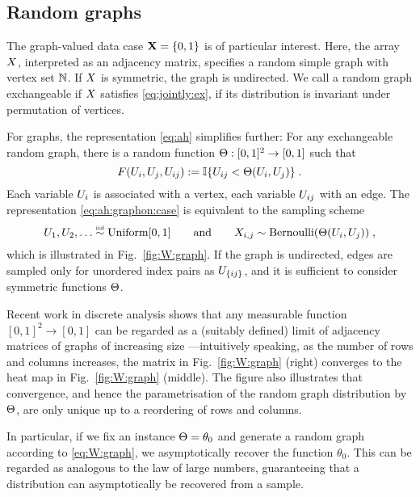 \subsection{Random graphs}

The graph-valued data case $\mathbf{X}=\lbrace{0,1}\rbrace$ is of particular interest. Here, the array $X$, interpreted as 
an adjacency matrix, specifies a random simple graph with vertex set $\mathbb{N}$. If $X$ is symmetric, the graph is undirected. We call a 
random graph exchangeable if $X$ satisfies \eqref{eq:jointly:ex}, \ie if its distribution is invariant under permutation of vertices.

For graphs, the representation \eqref{eq:ah} simplifies further:
For any exchangeable random graph, there is a random
function ${\Theta:[0,1]^2\rightarrow[0,1]}$ such that
\begin{equation}
  \label{eq:ah:graphon:case}
  F(U_i,U_j,U_{ij}):=\mathbb{I}\lbrace U_{ij} < \Theta(U_i,U_j)\rbrace\;.
\end{equation}
Each variable $U_i$ is associated with a vertex, each variable $U_{ij}$ with an edge. 
The representation \eqref{eq:ah:graphon:case} is equivalent to the sampling scheme
\begin{equation}
  \label{eq:W:graph}
  U_1,U_2,\dots\overset{\mbox{\tiny iid}}{\sim}\mbox{\rm Uniform}[0,1]\qquad\text{and}\qquad X_{i,j}\sim\mbox{\rm Bernoulli}(\Theta(U_i,U_j))\;,
\end{equation}
which is illustrated in Fig.~\ref{fig:W:graph}. If the graph is undirected, edges are sampled only for unordered index pairs as $U_{\lbrace ij\rbrace}$,
and it is sufficient to consider symmetric functions $\Theta$.

Recent work in discrete analysis shows that any measurable function $[0,1]^2\rightarrow[0,1]$ can be regarded as a (suitably defined) limit of adjacency matrices of graphs of increasing size \citep{Lovasz2006-hc}---intuitively speaking, 
as the number of rows and columns increases, the
matrix in Fig.~\ref{fig:W:graph} (right) converges to the heat map in Fig.~\ref{fig:W:graph} (middle).
The figure also illustrates that convergence, and hence the parametrisation of the random graph distribution
by $\Theta$, are only unique up to a reordering of rows and columns.

In particular, if we fix an instance ${\Theta=\theta_0}$ and generate a random graph according to \eqref{eq:W:graph},
we asymptotically recover the function $\theta_0$. This can be regarded as analogous to the law of large
numbers, guaranteeing that a distribution can asymptotically be recovered from a sample.

